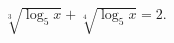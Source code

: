 \begin{ex}[type=equation]
	\begin{condition}
		$\sqrt[3]{\log_5 x} + \sqrt[4]{\log_5 x} = 2.$
	\end{condition}
\end{ex}
